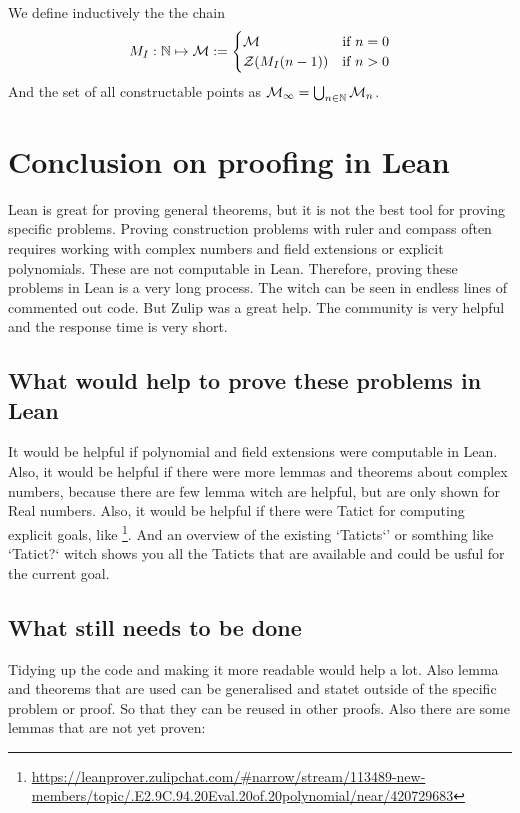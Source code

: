 \documentclass{../Proof_layout_PDF/TemplateExercise}
\begin{document}
\begin{definition}
    We define inductively the the chain
    \begin{equation*}
         M_I :  \mathbb{N} \mapsto \mathcal{M} := \begin{cases}
            \mathcal{M} & \text{if } n = 0 \\
            \mathcal{Z}(M_I(n-1)) & \text{if } n > 0
        \end{cases}
    \end{equation*}
    And the set of all constructable points as $\mathcal{M}_{\infty} = \bigcup_{n \in \mathbb{N}} \mathcal{M}_n$.
\end{definition}

\section{Conclusion on proofing in Lean}
Lean is great for proving general theorems, but it is not the best tool for proving specific problems.
Proving construction problems with ruler and compass often requires working with complex numbers and field extensions or explicit polynomials.
These are not computable in Lean. Therefore, proving these problems in Lean is a very long process. The witch can be seen in endless lines of commented out code. \newline
But Zulip was a great help. The community is very helpful and the response time is very short.
\subsection{What would help to prove these problems in Lean}
It would be helpful if polynomial and field extensions were computable in Lean. Also, it would be helpful if there were more lemmas and theorems about complex numbers, because there are few lemma witch are helpful, but are only shown for Real numbers.  \newline
Also, it would be helpful if there were Tatict for computing explicit goals, like \footnote[1]{\url{https://leanprover.zulipchat.com/\#narrow/stream/113489-new-members/topic/.E2.9C.94.20Eval.20of.20polynomial/near/420729683}}. \newline
And an overview of the existing `Taticts`' or somthing like `Tatict?` witch shows you all the Taticts that are available and could be usful for the current goal.

\subsection{What still needs to be done}
Tidying up the code and making it more readable would help a lot. Also lemma and theorems that are used can be generalised and statet outside of the specific problem or proof. So that they can be reused in other proofs. \newline
Also there are some lemmas that are not yet proven:
\end{document}
